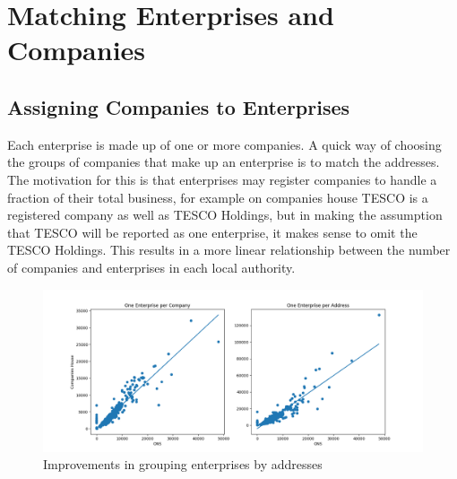 \documentclass[a4paper,10pt]{article}
\begin{document}
\section{Matching Enterprises and Companies}


\subsection{Assigning Companies to Enterprises}
Each enterprise is made up of one or more companies. A quick way of choosing the groups of companies that make up an enterprise is to match the addresses. The motivation for this is that enterprises may register companies to handle a fraction of their total business, for example on companies house TESCO is a registered company as well as TESCO Holdings, but in making the assumption that TESCO will be reported as one enterprise, it makes sense to omit the TESCO Holdings. This results in a more linear relationship between the number of companies and enterprises in each local authority.
\begin{figure}[!ht]
 \includegraphics[width=\textwidth]{graphics/filtered_addresses}
 \caption{Improvements in grouping enterprises by addresses}
\end{figure}
\end{document}
